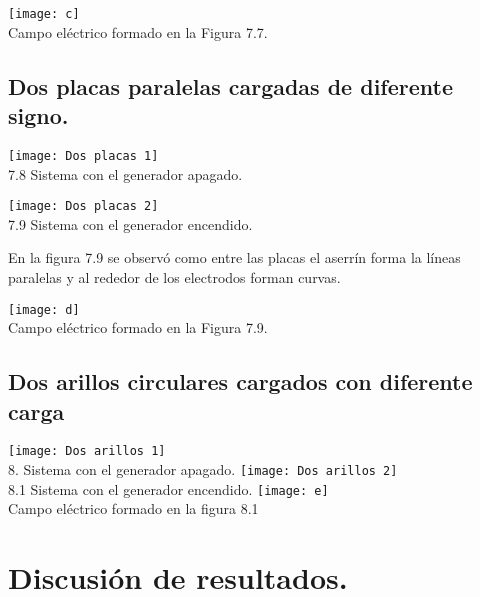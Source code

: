 \documentclass[10pt]{article}
\begin{document}
\begin{multicols}{2}
	\begin{center}
	
		\texttt{[image: c]}\\

		Campo eléctrico formado en la Figura 7.7.
	\end{center}

	\subsection{Dos placas paralelas cargadas de diferente signo.}

	\begin{center}
		
		\texttt{[image: Dos placas 1]}\\
		7.8 Sistema con el generador apagado.
	\end{center}

	\begin{center}
		\texttt{[image: Dos placas 2]}\\ 
		7.9 Sistema con el generador encendido.
		\label{fig:DosPlacas}
	\end{center}

	En la figura 7.9 se observó como entre las placas el aserrín forma la líneas paralelas y al rededor de los electrodos forman curvas.

	\begin{center}
		
		\texttt{[image: d]}\\
		Campo eléctrico formado en la Figura 7.9.
	\end{center}


	\subsection{Dos arillos circulares cargados con diferente carga}

	\begin{center}
		
		\texttt{[image: Dos arillos 1]}\\
		8. Sistema con el generador apagado.
		\texttt{[image: Dos arillos 2]}\\
		8.1 Sistema con el generador encendido.
		\texttt{[image: e]}\\
		Campo eléctrico formado en la figura 8.1
	\end{center}

	\section{Discusión de resultados.}


\end{multicols}
\end{document}
